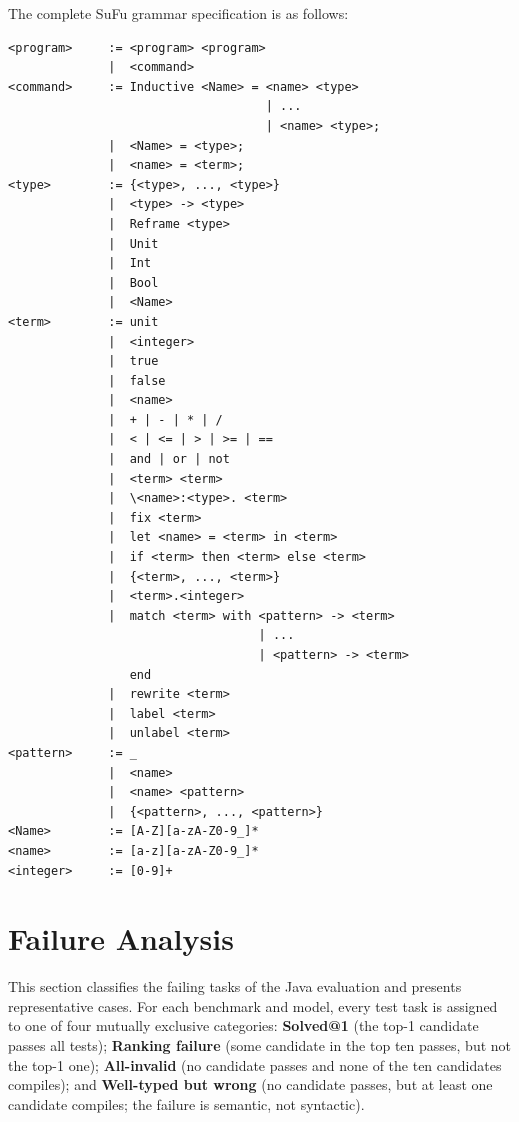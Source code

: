 The complete SuFu grammar specification is as follows:
\begin{tcolorbox}[
    colback=blue!5!white,
    colframe=blue!50!black,
    title=SuFu Language Grammar,
    fonttitle=\bfseries,
    boxrule=1pt,
    arc=3pt,
    breakable
]
\begin{Verbatim}[fontsize=\small]
<program>     := <program> <program>
              |  <command>
<command>     := Inductive <Name> = <name> <type> 
                                    | ... 
                                    | <name> <type>;
              |  <Name> = <type>;
              |  <name> = <term>;
<type>        := {<type>, ..., <type>}
              |  <type> -> <type>
              |  Reframe <type>
              |  Unit 
              |  Int 
              |  Bool 
              |  <Name>
<term>        := unit 
              |  <integer> 
              |  true 
              |  false 
              |  <name>
              |  + | - | * | / 
              |  < | <= | > | >= | == 
              |  and | or | not
              |  <term> <term>
              |  \<name>:<type>. <term>
              |  fix <term>
              |  let <name> = <term> in <term>
              |  if <term> then <term> else <term>
              |  {<term>, ..., <term>}
              |  <term>.<integer>
              |  match <term> with <pattern> -> <term> 
                                   | ... 
                                   | <pattern> -> <term> 
                 end
              |  rewrite <term> 
              |  label <term> 
              |  unlabel <term>
<pattern>     := _ 
              |  <name>
              |  <name> <pattern>
              |  {<pattern>, ..., <pattern>}
<Name>        := [A-Z][a-zA-Z0-9_]*
<name>        := [a-z][a-zA-Z0-9_]*
<integer>     := [0-9]+
\end{Verbatim}
\end{tcolorbox}

\section{Failure Analysis}\label{appendix-failure}

This section classifies the failing tasks of the Java evaluation and presents representative cases.
For each benchmark and model, every test task is assigned to one of four mutually exclusive categories:
\textbf{Solved@1} (the top-1 candidate passes all tests);
\textbf{Ranking failure} (some candidate in the top ten passes, but not the top-1 one);
\textbf{All-invalid} (no candidate passes and none of the ten candidates compiles); and
\textbf{Well-typed but wrong} (no candidate passes, but at least one candidate compiles; the failure is semantic, not syntactic).

